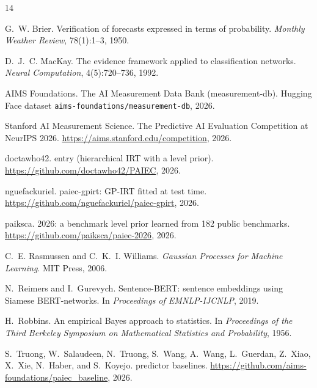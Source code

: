 \documentclass{article}
\begin{document}
\begin{thebibliography}{14}

G.~W. Brier.
\newblock Verification of forecasts expressed in terms of probability.
\newblock \emph{Monthly Weather Review}, 78(1):1--3, 1950.

D.~J.~C. MacKay.
\newblock The evidence framework applied to classification networks.
\newblock \emph{Neural Computation}, 4(5):720--736, 1992.

AIMS Foundations.
\newblock The {AI} Measurement Data Bank (measurement-db).
\newblock Hugging Face dataset \texttt{aims-foundations/measurement-db}, 2026.

Stanford AI Measurement Science.
\newblock The Predictive {AI} Evaluation Competition at {NeurIPS} 2026.
\newblock \url{https://aims.stanford.edu/competition}, 2026.

doctawho42.
 entry (hierarchical {IRT} with a level prior).
\newblock \url{https://github.com/doctawho42/PAIEC}, 2026.

nguefackuriel.
\newblock paiec-gpirt: {GP-IRT} fitted at test time.
\newblock \url{https://github.com/nguefackuriel/paiec-gpirt}, 2026.

paiksca.
 2026: a benchmark level prior learned from 182 public benchmarks.
\newblock \url{https://github.com/paiksca/paiec-2026}, 2026.

C.~E. Rasmussen and C.~K.~I. Williams.
\newblock \emph{Gaussian Processes for Machine Learning}.
\newblock MIT Press, 2006.

N.~Reimers and I.~Gurevych.
\newblock Sentence-{BERT}: sentence embeddings using {S}iamese {BERT}-networks.
\newblock In \emph{Proceedings of EMNLP-IJCNLP}, 2019.

H.~Robbins.
\newblock An empirical {B}ayes approach to statistics.
\newblock In \emph{Proceedings of the Third Berkeley Symposium on Mathematical Statistics and Probability}, 1956.

S.~Truong, W.~Salaudeen, N.~Truong, S.~Wang, A.~Wang, L.~Guerdan, Z.~Xiao, X.~Xie, N.~Haber, and S.~Koyejo.
 predictor baselines.
\newblock \url{https://github.com/aims-foundations/paiec_baseline}, 2026.


\end{thebibliography}
\end{document}

